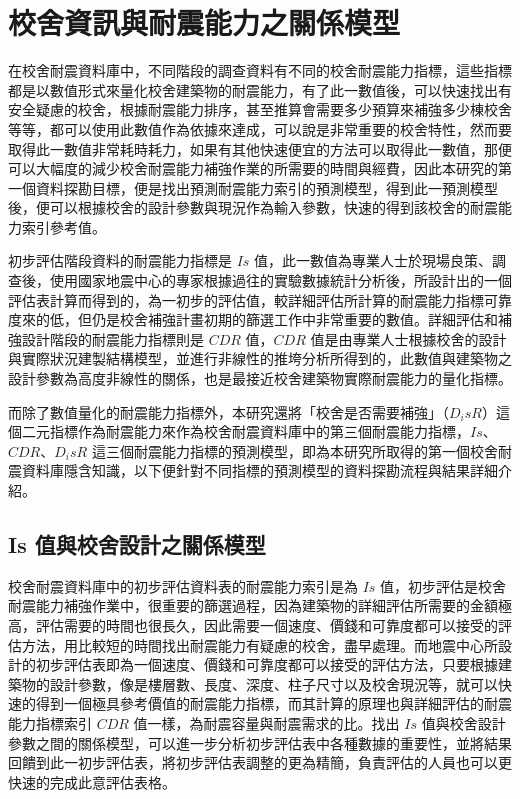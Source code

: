 \renewcommand\thetable{\arabic{chapter}-\arabic{table}}
\chapter{校舍資訊與耐震能力之關係模型}

在校舍耐震資料庫中，不同階段的調查資料有不同的校舍耐震能力指標，這些指標都是以數值形式來量化校舍建築物的耐震能力，有了此一數值後，可以快速找出有安全疑慮的校舍，根據耐震能力排序，甚至推算會需要多少預算來補強多少棟校舍等等，都可以使用此數值作為依據來達成，可以說是非常重要的校舍特性，然而要取得此一數值非常耗時耗力，如果有其他快速便宜的方法可以取得此一數值，那便可以大幅度的減少校舍耐震能力補強作業的所需要的時間與經費，因此本研究的第一個資料探勘目標，便是找出預測耐震能力索引的預測模型，得到此一預測模型後，便可以根據校舍的設計參數與現況作為輸入參數，快速的得到該校舍的耐震能力索引參考值。

初步評估階段資料的耐震能力指標是 $Is$ 值，此一數值為專業人士於現場良策、調查後，使用國家地震中心的專家根據過往的實驗數據統計分析後，所設計出的一個評估表計算而得到的，為一初步的評估值，較詳細評估所計算的耐震能力指標可靠度來的低，但仍是校舍補強計畫初期的篩選工作中非常重要的數值。詳細評估和補強設計階段的耐震能力指標則是 $CDR$ 值，$CDR$ 值是由專業人士根據校舍的設計與實際狀況建製結構模型，並進行非線性的推垮分析所得到的，此數值與建築物之設計參數為高度非線性的關係，也是最接近校舍建築物實際耐震能力的量化指標。

而除了數值量化的耐震能力指標外，本研究還將「校舍是否需要補強」（$D_isR$）這個二元指標作為耐震能力來作為校舍耐震資料庫中的第三個耐震能力指標，$Is$、$CDR$、$D_isR$ 這三個耐震能力指標的預測模型，即為本研究所取得的第一個校舍耐震資料庫隱含知識，以下便針對不同指標的預測模型的資料探勘流程與結果詳細介紹。

\section{Is 值與校舍設計之關係模型}

校舍耐震資料庫中的初步評估資料表的耐震能力索引是為 $Is$ 值，初步評估是校舍耐震能力補強作業中，很重要的篩選過程，因為建築物的詳細評估所需要的金額極高，評估需要的時間也很長久，因此需要一個速度、價錢和可靠度都可以接受的評估方法，用比較短的時間找出耐震能力有疑慮的校舍，盡早處理。而地震中心所設計的初步評估表即為一個速度、價錢和可靠度都可以接受的評估方法，只要根據建築物的設計參數，像是樓層數、長度、深度、柱子尺寸以及校舍現況等，就可以快速的得到一個極具參考價值的耐震能力指標，而其計算的原理也與詳細評估的耐震能力指標索引 $CDR$ 值一樣，為耐震容量與耐震需求的比。找出 $Is$ 值與校舍設計參數之間的關係模型，可以進一步分析初步評估表中各種數據的重要性，並將結果回饋到此一初步評估表，將初步評估表調整的更為精簡，負責評估的人員也可以更快速的完成此意評估表格。

